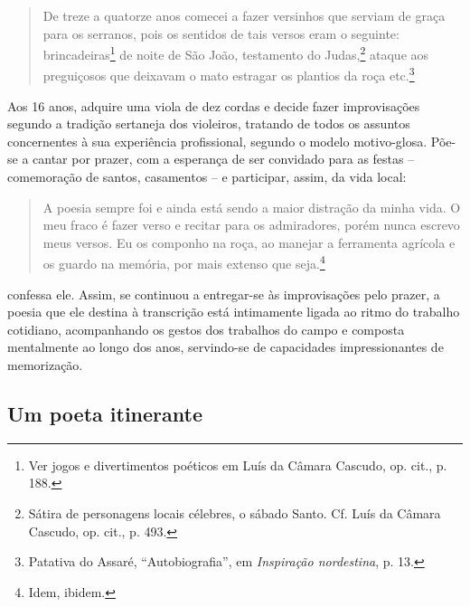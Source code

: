 \begin{quote}
De treze a quatorze anos comecei a fazer
versinhos que serviam de graça para os serranos, pois os sentidos de tais versos
eram o seguinte: brincadeiras\footnote{ Ver jogos e divertimentos poéticos em
Luís da Câmara Cascudo, op. cit., p. 188.} de noite de São João,
testamento do Judas,\footnote{ Sátira de personagens locais célebres, o sábado
Santo. Cf. Luís da Câmara Cascudo, op. cit., p. 493.} ataque aos
preguiçosos que deixavam o mato estragar os plantios da roça etc.\footnote{
Patativa do Assaré, “Autobiografia”, em \textit{Inspiração nordestina}, p. 13.}
\end{quote}

\noindent Aos 16 anos, adquire uma viola de dez cordas e decide fazer improvisações
segundo a tradição sertaneja dos violeiros, tratando de todos os assuntos
concernentes à sua experiência profissional, segundo o modelo motivo-glosa.
Põe-se a cantar por prazer, com a esperança de ser convidado para as festas --
comemoração de santos, casamentos -- e participar, assim, da vida local: 

\begin{quote}
A poesia sempre foi e ainda está sendo a maior distração da minha vida. O meu
fraco é fazer verso e recitar para os admiradores, porém nunca escrevo meus
versos. Eu os componho na roça, ao manejar a ferramenta agrícola e os guardo na
memória, por mais extenso que seja.\footnote{ Idem, ibidem.}
\end{quote}

\noindent confessa ele.
Assim, se continuou a entregar-se às improvisações pelo prazer, a poesia que ele
destina à transcrição está intimamente ligada ao ritmo do trabalho cotidiano,
acompanhando os gestos dos trabalhos do campo e composta mentalmente ao longo
dos anos, servindo-se de capacidades impressionantes de memorização.

\subsection{Um poeta itinerante}

